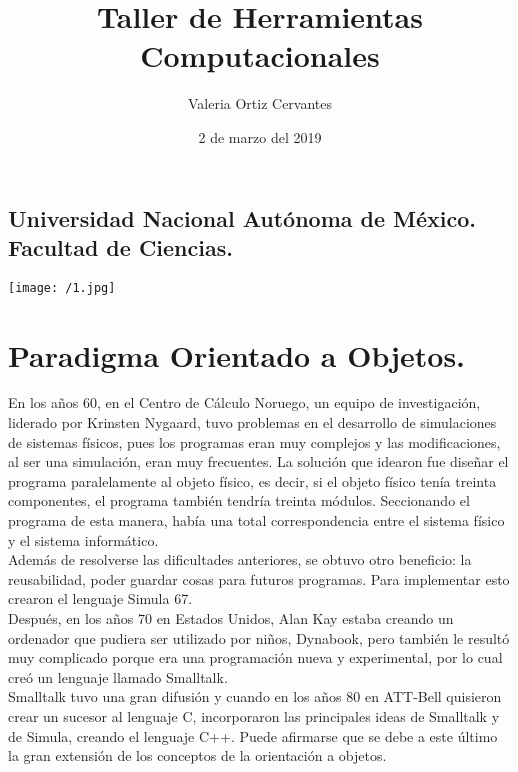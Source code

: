 \documentclass{article}
\title{\Huge Taller de Herramientas Computacionales}
\author{\huge Valeria Ortiz Cervantes}
\date{\LARGE 2 de marzo del 2019}
\begin{document}
\maketitle
\begin{center}
	\subsection*{\LARGE Universidad Nacional Autónoma de México.\\Facultad de Ciencias.\\}
	\texttt{[image: /1.jpg]}
\end{center}
\newpage
\section*{Paradigma Orientado a Objetos.}
En los años 60, en el Centro de Cálculo Noruego, un equipo de investigación, liderado por Krinsten Nygaard, tuvo problemas en el desarrollo de simulaciones de sistemas físicos, pues los programas eran muy complejos y las modificaciones, al ser una simulación, eran muy frecuentes. La solución que idearon fue diseñar el programa paralelamente al objeto físico, es decir, si el objeto físico tenía treinta componentes, el programa también tendría treinta módulos. Seccionando el programa de esta manera, había una total correspondencia entre el sistema físico y el sistema informático.\\Además de resolverse las dificultades anteriores, se obtuvo otro beneficio: la reusabilidad, poder guardar cosas para futuros programas. Para implementar esto crearon el lenguaje Simula 67.\\Después, en los años 70 en Estados Unidos, Alan Kay estaba creando un ordenador que pudiera ser utilizado por niños, Dynabook, pero también le resultó muy complicado porque era una programación nueva y experimental, por lo cual creó un lenguaje llamado Smalltalk.\\Smalltalk tuvo una gran difusión y cuando en los años 80 en ATT-Bell quisieron crear un sucesor al lenguaje C, incorporaron las principales ideas de Smalltalk y de Simula, creando el lenguaje C++. Puede afirmarse que se debe a este último la gran extensión de los conceptos de la orientación a objetos.
\end{document}
